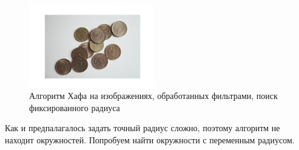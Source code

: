 \documentclass[a4paper,12pt]{article}
\begin{document}
\begin{figure}[H]
\begin{minipage}{0.48\textwidth}
    \end{minipage}
    \includegraphics[width=0.48\textwidth]{images/hough_circles/2_proc_fixed.png}
    \caption{Алгоритм Хафа на изображениях, обработанных фильтрами, поиск фиксированного радиуса}
\end{figure}
\noindent Как и предпалагалось задать точный радиус сложно, поэтому алгоритм не находит окружностей. Попробуем найти окружности с переменным радиусом. 
\end{document}
